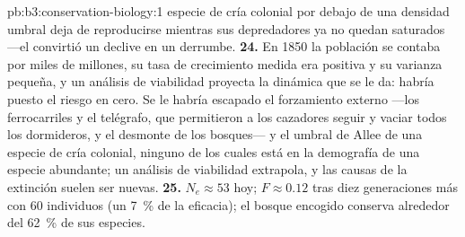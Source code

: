 \begin{solution}{pb:b3:conservation-biology:1}
especie de cría colonial por debajo de una densidad umbral deja de
reproducirse mientras sus depredadores ya no quedan saturados ---el
 convirtió un declive en un derrumbe.
\textbf{24.} En 1850 la población se contaba por miles de millones, su
tasa de crecimiento medida era positiva y su varianza pequeña, y un
análisis de viabilidad proyecta la dinámica que se le da: habría puesto
el riesgo en cero. Se le habría escapado el forzamiento externo ---los
ferrocarriles y el telégrafo, que permitieron a los cazadores seguir y
vaciar todos los dormideros, y el desmonte de los bosques--- y el umbral
de Allee de una especie de cría colonial, ninguno de los cuales está en
la demografía de una especie abundante; un análisis de viabilidad
extrapola, y las causas de la extinción suelen ser nuevas.
\textbf{25.} $N_{e} \approx 53$ hoy; $F \approx 0.12$ tras diez
generaciones más con 60 individuos (un \qty{7}{\%} de la eficacia); el
bosque encogido conserva alrededor del \qty{62}{\%} de sus especies.
\end{solution}
